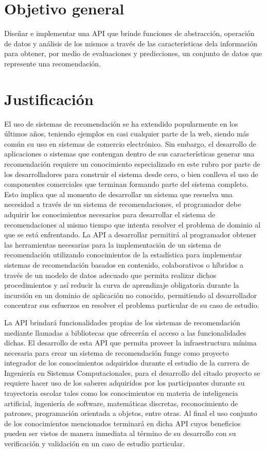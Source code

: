   \section {Objetivo general}
    Diseñar e implementar una API que brinde funciones de abstracción, operación de datos y análisis de los mismos a través de las características dela información para obtener, por medio de evaluaciones y predicciones, un conjunto de datos que represente una recomendación.

  \section{Justificación}
    El uso de sistemas de recomendación se ha extendido popularmente en los últimos años, teniendo ejemplos en casi cualquier parte de la web, siendo más común su uso en sistemas de comercio electrónico. Sin embargo, el desarrollo de aplicaciones o sistemas que contengan dentro de sus características generar una recomendación requiere un conocimiento especializado en este rubro por parte de los desarrolladores para construir el sistema desde cero, o bien conlleva el uso de componentes comerciales que terminan formando parte del sistema completo. Esto implica que al momento de desarrollar un sistema que resuelva una necesidad a través de un sistema de recomendaciones, el programador debe adquirir los conocimientos necesarios para desarrollar el sistema de recomendaciones al mismo tiempo que intenta resolver el problema de dominio al que se está enfrentando. La API a desarrollar permitirá al programador obtener las herramientas necesarias para la implementación de un sistema de recomendación utilizando conocimientos de la estadística para implementar sistemas de recomendación basados en contenido, colaborativos o híbridos a través de un modelo de datos adecuado que permita realizar dichos procedimientos y así reducir la curva de aprendizaje obligatoria durante la incursión en un dominio de aplicación no conocido, permitiendo al desarrollador concentrar sus esfuerzos en resolver el problema particular de su caso de estudio. 

    La API brindará funcionalidades propias de los sistemas de recomendación mediante llamadas a bibliotecas que ofrecerán el acceso a las funcionalidades dichas. El desarrollo de esta API que permita proveer la infraestructura mínima necesaria para crear un sistema de recomendación funge como proyecto integrador de los conocimientos adquiridos durante el estudio de la carrera de Ingeniería en Sistemas Computacionales, para el desarrollo del citado proyecto se requiere hacer uso de los saberes adquiridos por los participantes durante su trayectoria escolar tales como los conocimientos en materia de inteligencia artificial, ingeniería de software, matemáticas discretas, reconocimiento de patrones, programación orientada a objetos, entre otras. Al final el uso conjunto de los conocimientos mencionados terminará en dicha API cuyos beneficios pueden ser vistos de manera inmediata al término de su desarrollo con su verificación y validación en un caso de estudio particular.
